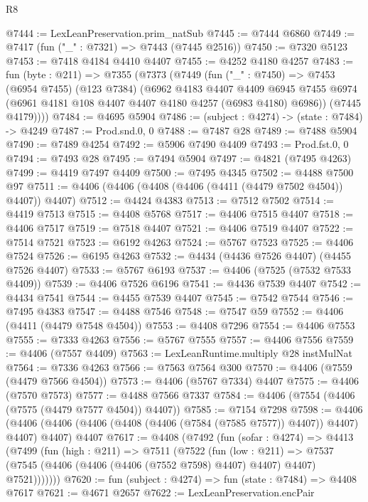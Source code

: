 \begin{lexlean}{R8}
\begin{coremodule}
@7444 := LexLeanPreservation.prim_natSub
@7445 := @7444 @6860
@7449 := @7417 (fun ("_" : @7321) => @7443 (@7445 @2516))
@7450 := @7320 @5123
@7453 := @7418 @4184 @4410 @4407
@7455 := @4252 @4180 @4257
@7483 := fun (byte : @211) =>
  @7355
    (@7373
      (@7449
        (fun ("_" : @7450) =>
        @7453
          (@6954 @7455)
          (@123 @7384)
          (@6962
            @4183
            @4407
            @4409
            @6945
            @7455
            @6974
            (@6961 @4181 @108 @4407 @4407 @4180 @4257 (@6983 @4180) @6986))
          (@7445 @4179))))
@7484 := @4695 @5904
@7486 := (subject : @4274) -> (state : @7484) -> @4249
@7487 := Prod.snd.{0, 0}
@7488 := @7487 @28
@7489 := @7488 @5904
@7490 := @7489 @4254
@7492 := @5906 @7490 @4409
@7493 := Prod.fst.{0, 0}
@7494 := @7493 @28
@7495 := @7494 @5904
@7497 := @4821 (@7495 @4263)
@7499 := @4419 @7497 @4409
@7500 := @7495 @4345
@7502 := @4488 @7500 @97
@7511 := @4406 (@4406 (@4408 (@4406 (@4411 (@4479 @7502 @4504)) @4407)) @4407)
@7512 := @4424 @4383
@7513 := @7512 @7502
@7514 := @4419 @7513
@7515 := @4408 @5768
@7517 := @4406 @7515 @4407
@7518 := @4406 @7517
@7519 := @7518 @4407
@7521 := @4406 @7519 @4407
@7522 := @7514 @7521
@7523 := @6192 @4263
@7524 := @5767 @7523
@7525 := @4406 @7524
@7526 := @6195 @4263
@7532 := @4434 (@4436 @7526 @4407) (@4455 @7526 @4407)
@7533 := @5767 @6193
@7537 := @4406 (@7525 (@7532 @7533 @4409))
@7539 := @4406 @7526 @6196
@7541 := @4436 @7539 @4407
@7542 := @4434 @7541
@7544 := @4455 @7539 @4407
@7545 := @7542 @7544
@7546 := @7495 @4383
@7547 := @4488 @7546
@7548 := @7547 @59
@7552 := @4406 (@4411 (@4479 @7548 @4504))
@7553 := @4408 @7296
@7554 := @4406 @7553
@7555 := @7333 @4263
@7556 := @5767 @7555
@7557 := @4406 @7556
@7559 := @4406 (@7557 @4409)
@7563 := LexLeanRuntime.multiply @28 instMulNat
@7564 := @7336 @4263
@7566 := @7563 @7564 @300
@7570 := @4406 (@7559 (@4479 @7566 @4504))
@7573 := @4406 (@5767 @7334) @4407
@7575 := @4406 (@7570 @7573)
@7577 := @4488 @7566 @7337
@7584 := @4406 (@7554 (@4406 (@7575 (@4479 @7577 @4504)) @4407))
@7585 := @7154 @7298
@7598 := @4406
    (@4406 (@4406 (@4406 (@4408 (@4406 (@7584 (@7585 @7577)) @4407)) @4407) @4407) @4407)
    @4407
@7617 := @4408
    (@7492
      (fun (sofar : @4274) =>
      @4413
        (@7499
          (fun (high : @211) =>
          @7511
            (@7522
              (fun (low : @211) =>
              @7537 (@7545 (@4406 (@4406 (@4406 (@7552 @7598) @4407) @4407) @4407) @7521)))))))
@7620 := fun (subject : @4274) => fun (state : @7484) => @4408 @7617
@7621 := @4671 @2657
@7622 := LexLeanPreservation.encPair

\end{coremodule}
\end{lexlean}
